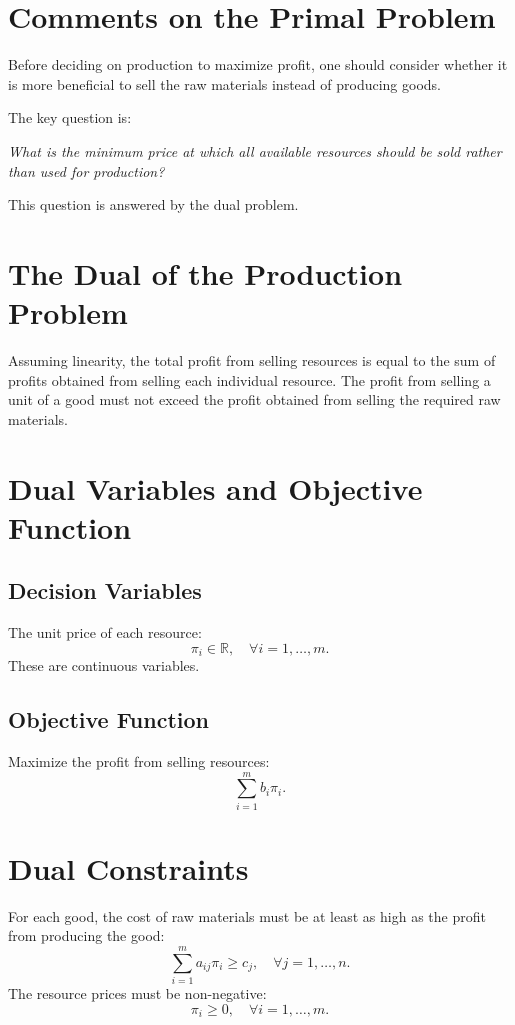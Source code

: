 \documentclass[a4paper, 11pt]{article}
\begin{document}
\section{Comments on the Primal Problem}
Before deciding on production to maximize profit, one should consider whether it is more beneficial to sell the raw materials instead of producing goods.

The key question is:

\textit{What is the minimum price at which all available resources should be sold rather than used for production?}

This question is answered by the dual problem.

\section{The Dual of the Production Problem}

Assuming linearity, the total profit from selling resources is equal to the sum of profits obtained from selling each individual resource. The profit from selling a unit of a good must not exceed the profit obtained from selling the required raw materials.

\section{Dual Variables and Objective Function}

\subsection{Decision Variables}
The unit price of each resource:
\[ \pi_{i} \in \mathbb{R}, \quad \forall i = 1, \dots, m. \]
These are continuous variables.

\subsection{Objective Function}
Maximize the profit from selling resources:
\[ \sum_{i=1}^{m} b_{i} \pi_{i}. \]

\section{Dual Constraints}
For each good, the cost of raw materials must be at least as high as the profit from producing the good:
\[ \sum_{i=1}^{m} a_{ij} \pi_{i} \geq c_{j}, \quad \forall j=1,\dots,n. \]
The resource prices must be non-negative:
\[ \pi_{i} \geq 0, \quad \forall i=1,\dots,m. \]
\end{document}
